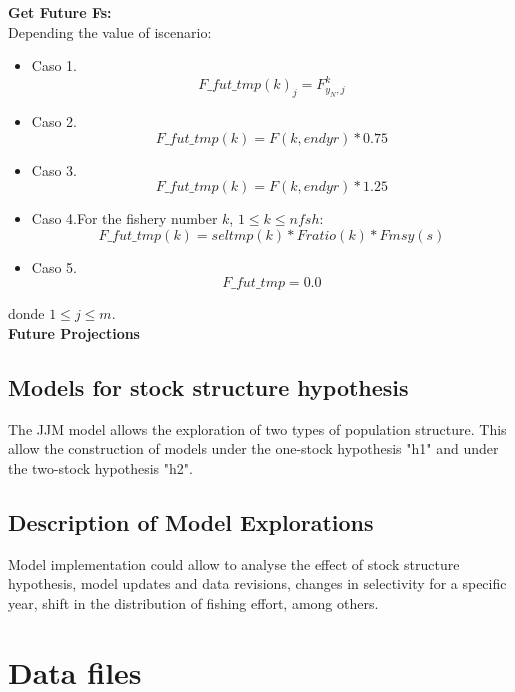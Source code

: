 \documentclass{article}
\begin{document}
\textbf{Get Future Fs:}\\
Depending the value of iscenario:
\begin{itemize}
    \item Caso 1. \begin{equation}
        F\_fut\_tmp(k)_j=F^k_{y_N,j}
    \end{equation}
    \item Caso 2.  \begin{equation}
        F\_fut\_tmp(k) = F(k,endyr)*0.75
    \end{equation}
    \item Caso 3.  \begin{equation}
        F\_fut\_tmp(k) = F(k,endyr)*1.25
    \end{equation}
    \item Caso 4.For the fishery number $k$, $1\leq k \leq nfsh$:
    \begin{equation}
        F\_fut\_tmp(k)=seltmp(k)*Fratio(k)*Fmsy(s)
    \end{equation}
    \item Caso 5.
    \begin{equation}
        F\_fut\_tmp = 0.0
    \end{equation}
\end{itemize}
donde $1\leq j \leq m$.\\
\textbf{Future Projections}
\subsection{Models for stock structure hypothesis}

The JJM model allows the exploration of two types of population structure. This allow the construction of models under the one-stock hypothesis "h1" and under the two-stock hypothesis "h2".

\subsection{Description of Model Explorations}

Model implementation could allow to analyse the effect of stock structure hypothesis, model updates and data revisions, changes in selectivity for a specific year, shift in the distribution of fishing effort, among others. 

\section{Data files}
\end{document}
